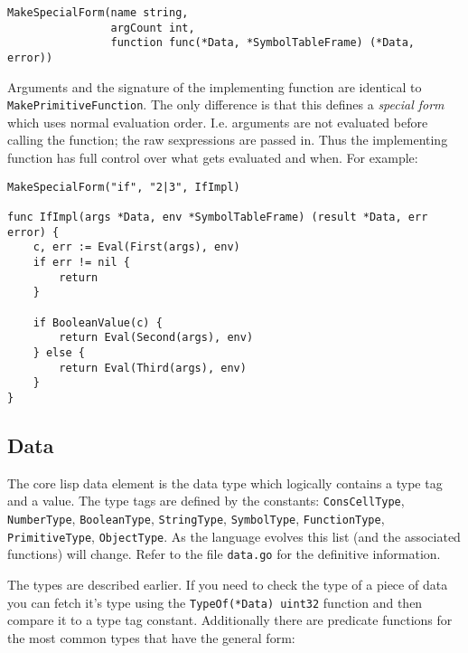 \documentclass{article}
\begin{document}
\begin{verbatim}
MakeSpecialForm(name string,
                argCount int,
                function func(*Data, *SymbolTableFrame) (*Data, error))
\end{verbatim}

Arguments and the signature of the implementing function are identical to
\verb|MakePrimitiveFunction|. The only difference is that this defines a \emph{special form}
which uses normal evaluation order. I.e. arguments are not evaluated before calling the
function; the raw sexpressions are passed in. Thus the implementing function has full control
over what gets evaluated and when. For example:

\begin{verbatim}
MakeSpecialForm("if", "2|3", IfImpl)

func IfImpl(args *Data, env *SymbolTableFrame) (result *Data, err error) {
    c, err := Eval(First(args), env)
    if err != nil {
        return
    }

    if BooleanValue(c) {
        return Eval(Second(args), env)
    } else {
        return Eval(Third(args), env)
    }
}
\end{verbatim}

\subsection{Data}\label{sec:data}

The core lisp data element is the data type which logically contains a type tag and a value.
The type tags are defined by the constants: \verb|ConsCellType|, \verb|NumberType|,
\verb|BooleanType|, \verb|StringType|, \verb|SymbolType|, \verb|FunctionType|,
\verb|PrimitiveType|, \verb|ObjectType|. As the language evolves this list (and the
associated functions) will change. Refer to the file \verb|data.go| for
the definitive information.

The types are described earlier. If you need to check the type of a piece of data you can
fetch it’s type using the \verb|TypeOf(*Data) uint32| function and then compare it to a type
tag constant. Additionally there are predicate functions for the most common types that have
the general form:
\end{document}
